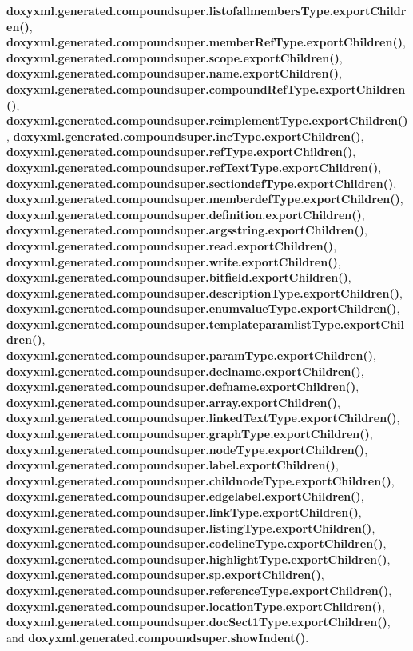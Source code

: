 {\bf doxyxml.\+generated.\+compoundsuper.\+listofallmembers\+Type.\+export\+Children()}, {\bf doxyxml.\+generated.\+compoundsuper.\+member\+Ref\+Type.\+export\+Children()}, {\bf doxyxml.\+generated.\+compoundsuper.\+scope.\+export\+Children()}, {\bf doxyxml.\+generated.\+compoundsuper.\+name.\+export\+Children()}, {\bf doxyxml.\+generated.\+compoundsuper.\+compound\+Ref\+Type.\+export\+Children()}, {\bf doxyxml.\+generated.\+compoundsuper.\+reimplement\+Type.\+export\+Children()}, {\bf doxyxml.\+generated.\+compoundsuper.\+inc\+Type.\+export\+Children()}, {\bf doxyxml.\+generated.\+compoundsuper.\+ref\+Type.\+export\+Children()}, {\bf doxyxml.\+generated.\+compoundsuper.\+ref\+Text\+Type.\+export\+Children()}, {\bf doxyxml.\+generated.\+compoundsuper.\+sectiondef\+Type.\+export\+Children()}, {\bf doxyxml.\+generated.\+compoundsuper.\+memberdef\+Type.\+export\+Children()}, {\bf doxyxml.\+generated.\+compoundsuper.\+definition.\+export\+Children()}, {\bf doxyxml.\+generated.\+compoundsuper.\+argsstring.\+export\+Children()}, {\bf doxyxml.\+generated.\+compoundsuper.\+read.\+export\+Children()}, {\bf doxyxml.\+generated.\+compoundsuper.\+write.\+export\+Children()}, {\bf doxyxml.\+generated.\+compoundsuper.\+bitfield.\+export\+Children()}, {\bf doxyxml.\+generated.\+compoundsuper.\+description\+Type.\+export\+Children()}, {\bf doxyxml.\+generated.\+compoundsuper.\+enumvalue\+Type.\+export\+Children()}, {\bf doxyxml.\+generated.\+compoundsuper.\+templateparamlist\+Type.\+export\+Children()}, {\bf doxyxml.\+generated.\+compoundsuper.\+param\+Type.\+export\+Children()}, {\bf doxyxml.\+generated.\+compoundsuper.\+declname.\+export\+Children()}, {\bf doxyxml.\+generated.\+compoundsuper.\+defname.\+export\+Children()}, {\bf doxyxml.\+generated.\+compoundsuper.\+array.\+export\+Children()}, {\bf doxyxml.\+generated.\+compoundsuper.\+linked\+Text\+Type.\+export\+Children()}, {\bf doxyxml.\+generated.\+compoundsuper.\+graph\+Type.\+export\+Children()}, {\bf doxyxml.\+generated.\+compoundsuper.\+node\+Type.\+export\+Children()}, {\bf doxyxml.\+generated.\+compoundsuper.\+label.\+export\+Children()}, {\bf doxyxml.\+generated.\+compoundsuper.\+childnode\+Type.\+export\+Children()}, {\bf doxyxml.\+generated.\+compoundsuper.\+edgelabel.\+export\+Children()}, {\bf doxyxml.\+generated.\+compoundsuper.\+link\+Type.\+export\+Children()}, {\bf doxyxml.\+generated.\+compoundsuper.\+listing\+Type.\+export\+Children()}, {\bf doxyxml.\+generated.\+compoundsuper.\+codeline\+Type.\+export\+Children()}, {\bf doxyxml.\+generated.\+compoundsuper.\+highlight\+Type.\+export\+Children()}, {\bf doxyxml.\+generated.\+compoundsuper.\+sp.\+export\+Children()}, {\bf doxyxml.\+generated.\+compoundsuper.\+reference\+Type.\+export\+Children()}, {\bf doxyxml.\+generated.\+compoundsuper.\+location\+Type.\+export\+Children()}, {\bf doxyxml.\+generated.\+compoundsuper.\+doc\+Sect1\+Type.\+export\+Children()}, and {\bf doxyxml.\+generated.\+compoundsuper.\+show\+Indent()}.




